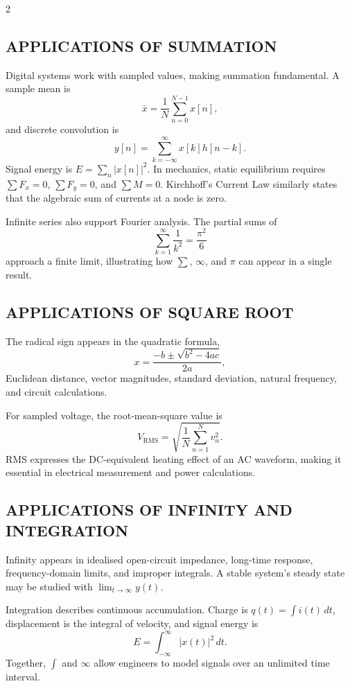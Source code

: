 \begin{multicols}{2}
  \subsection*{\centering\uppercase{Applications of Summation}}
  Digital systems work with sampled values, making summation fundamental. A sample mean is
  \[
    \bar{x}=\frac{1}{N}\sum_{n=0}^{N-1}x[n],
  \]
  and discrete convolution is
  \[
    y[n]=\sum_{k=-\infty}^{\infty}x[k]h[n-k].
  \]
  Signal energy is $E=\sum_n|x[n]|^2$. In mechanics, static equilibrium requires $\sum F_x=0$, $\sum F_y=0$, and $\sum M=0$. Kirchhoff's Current Law similarly states that the algebraic sum of currents at a node is zero.

  Infinite series also support Fourier analysis. The partial sums of
  \[
    \sum_{k=1}^{\infty}\frac{1}{k^2}=\frac{\pi^2}{6}
  \]
  approach a finite limit, illustrating how $\sum$, $\infty$, and $\pi$ can appear in a single result.

  \subsection*{\centering\uppercase{Applications of Square Root}}
  The radical sign appears in the quadratic formula,
  \[
    x=\frac{-b\pm\sqrt{b^2-4ac}}{2a},
  \]
  Euclidean distance, vector magnitudes, standard deviation, natural frequency, and circuit calculations.

  \noindent
  For sampled voltage, the root-mean-square value is
  \[
    V_{\mathrm{RMS}}=\sqrt{\frac{1}{N}\sum_{n=1}^{N}v_n^2}.
  \]
  RMS expresses the DC-equivalent heating effect of an AC waveform, making it essential in electrical measurement and power calculations.

  \subsection*{\centering\uppercase{Applications of Infinity and Integration}}
  {\justifying
  Infinity appears in idealised open-circuit impedance, long-time response, frequency-domain limits, and improper integrals. A stable system's steady state may be studied with $\lim_{t\to\infty}y(t)$.\par}

  \noindent
  Integration describes continuous accumulation. Charge is $q(t)=\int i(t)\,dt$, displacement is the integral of velocity, and signal energy is
  \[
    E=\int_{-\infty}^{\infty}|x(t)|^2\,dt.
  \]
  Together, $\int$ and $\infty$ allow engineers to model signals over an unlimited time interval.


\end{multicols}
